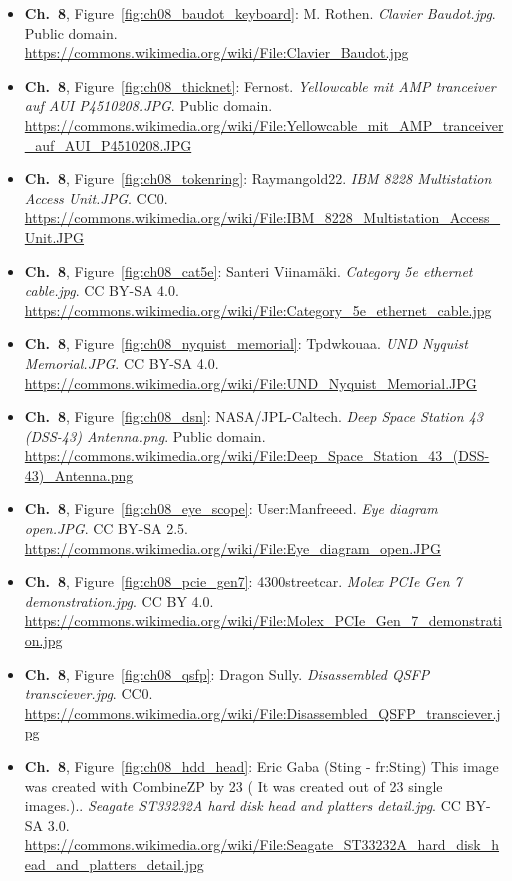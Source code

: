 \begin{small}
\begin{itemize}[leftmargin=0pt,itemsep=2pt,label={}]
\item \textbf{Ch.~8}, Figure~\ref{fig:ch08_baudot_keyboard}: M. Rothen. \emph{Clavier Baudot.\allowbreak{}jpg}. Public domain. \url{https://commons.wikimedia.org/wiki/File:Clavier_Baudot.jpg}
\item \textbf{Ch.~8}, Figure~\ref{fig:ch08_thicknet}: Fernost. \emph{Yellowcable mit AMP tranceiver auf AUI P4510208.\allowbreak{}JPG}. Public domain. \url{https://commons.wikimedia.org/wiki/File:Yellowcable_mit_AMP_tranceiver_auf_AUI_P4510208.JPG}
\item \textbf{Ch.~8}, Figure~\ref{fig:ch08_tokenring}: Raymangold22. \emph{IBM 8228 Multistation Access Unit.\allowbreak{}JPG}. CC0. \url{https://commons.wikimedia.org/wiki/File:IBM_8228_Multistation_Access_Unit.JPG}
\item \textbf{Ch.~8}, Figure~\ref{fig:ch08_cat5e}: Santeri Viinamäki. \emph{Category 5e ethernet cable.\allowbreak{}jpg}. CC BY-SA 4.0. \url{https://commons.wikimedia.org/wiki/File:Category_5e_ethernet_cable.jpg}
\item \textbf{Ch.~8}, Figure~\ref{fig:ch08_nyquist_memorial}: Tpdwkouaa. \emph{UND Nyquist Memorial.\allowbreak{}JPG}. CC BY-SA 4.0. \url{https://commons.wikimedia.org/wiki/File:UND_Nyquist_Memorial.JPG}
\item \textbf{Ch.~8}, Figure~\ref{fig:ch08_dsn}: NASA/JPL-Caltech. \emph{Deep Space Station 43 (DSS-\allowbreak{}43) Antenna.\allowbreak{}png}. Public domain. \url{https://commons.wikimedia.org/wiki/File:Deep_Space_Station_43_(DSS-43)_Antenna.png}
\item \textbf{Ch.~8}, Figure~\ref{fig:ch08_eye_scope}: User:Manfreeed. \emph{Eye diagram open.\allowbreak{}JPG}. CC BY-SA 2.5. \url{https://commons.wikimedia.org/wiki/File:Eye_diagram_open.JPG}
\item \textbf{Ch.~8}, Figure~\ref{fig:ch08_pcie_gen7}: 4300streetcar. \emph{Molex PCIe Gen 7 demonstration.\allowbreak{}jpg}. CC BY 4.0. \url{https://commons.wikimedia.org/wiki/File:Molex_PCIe_Gen_7_demonstration.jpg}
\item \textbf{Ch.~8}, Figure~\ref{fig:ch08_qsfp}: Dragon Sully. \emph{Disassembled QSFP transciever.\allowbreak{}jpg}. CC0. \url{https://commons.wikimedia.org/wiki/File:Disassembled_QSFP_transciever.jpg}
\item \textbf{Ch.~8}, Figure~\ref{fig:ch08_hdd_head}: Eric Gaba (Sting - fr:Sting) This image was created with CombineZP by 23 ( It was created out of 23 single images.).. \emph{Seagate ST33232A hard disk head and platters detail.\allowbreak{}jpg}. CC BY-SA 3.0. \url{https://commons.wikimedia.org/wiki/File:Seagate_ST33232A_hard_disk_head_and_platters_detail.jpg}

\end{itemize}
\end{small}
